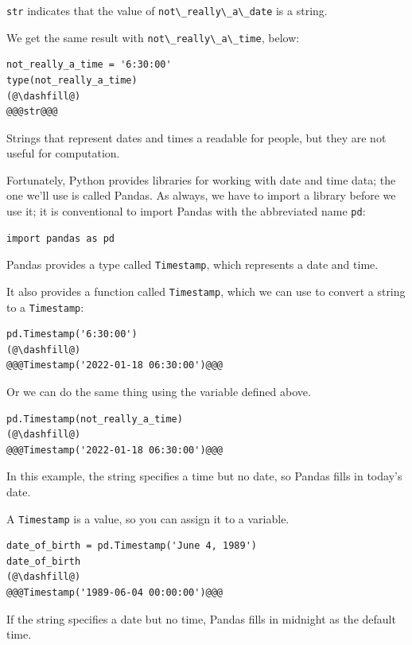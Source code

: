 \passthrough{\lstinline!str!} indicates that the value of
\passthrough{\lstinline!not\_really\_a\_date!} is a string.

We get the same result with
\passthrough{\lstinline!not\_really\_a\_time!}, below:

\begin{lstlisting}[]
not_really_a_time = '6:30:00'
type(not_really_a_time)
(@\dashfill@)
@@@str@@@
\end{lstlisting}

Strings that represent dates and times a readable for people, but they
are not useful for computation.

Fortunately, Python provides libraries for working with date and time
data; the one we'll use is called Pandas. As always, we have to import a
library before we use it; it is conventional to import Pandas with the
abbreviated name \passthrough{\lstinline!pd!}:

\begin{lstlisting}[]
import pandas as pd
\end{lstlisting}

Pandas provides a type called \passthrough{\lstinline!Timestamp!}, which
represents a date and time.

It also provides a function called \passthrough{\lstinline!Timestamp!},
which we can use to convert a string to a
\passthrough{\lstinline!Timestamp!}:

\begin{lstlisting}[]
pd.Timestamp('6:30:00')
(@\dashfill@)
@@@Timestamp('2022-01-18 06:30:00')@@@
\end{lstlisting}

Or we can do the same thing using the variable defined above.

\begin{lstlisting}[]
pd.Timestamp(not_really_a_time)
(@\dashfill@)
@@@Timestamp('2022-01-18 06:30:00')@@@
\end{lstlisting}

In this example, the string specifies a time but no date, so Pandas
fills in today's date.

A \passthrough{\lstinline!Timestamp!} is a value, so you can assign it
to a variable.

\begin{lstlisting}[]
date_of_birth = pd.Timestamp('June 4, 1989')
date_of_birth
(@\dashfill@)
@@@Timestamp('1989-06-04 00:00:00')@@@
\end{lstlisting}

If the string specifies a date but no time, Pandas fills in midnight as
the default time.

